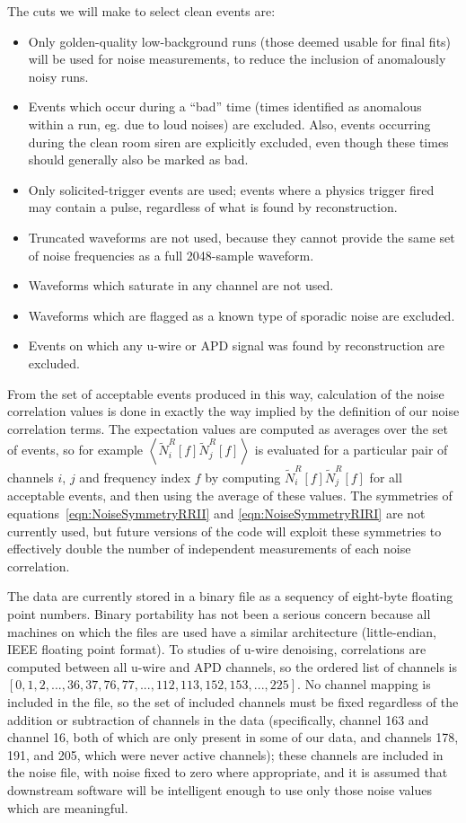 The cuts we will make to select clean events are:
\begin{itemize}
\item Only golden-quality low-background runs (those deemed usable for final fits) will be used for noise measurements, to reduce the inclusion of anomalously noisy runs.
\item Events which occur during a ``bad'' time (times identified as anomalous within a run, eg. due to loud noises) are excluded.  Also, events occurring during the clean room siren are explicitly excluded, even though these times should generally also be marked as bad.
\item Only solicited-trigger events are used; events where a physics trigger fired may contain a pulse, regardless of what is found by reconstruction.
\item Truncated waveforms are not used, because they cannot provide the same set of noise frequencies as a full 2048-sample waveform.
\item Waveforms which saturate in any channel are not used.
\item Waveforms which are flagged as a known type of sporadic noise are excluded.
\item Events on which any u-wire or APD signal was found by reconstruction are excluded.
\end{itemize}

From the set of acceptable events produced in this way, calculation of the noise correlation values is done in exactly the way implied by the definition of our noise correlation terms.  The expectation values are computed as averages over the set of events, so for example $\left<\widetilde{N}^R_i[f] \widetilde{N}^R_j[f]\right>$ is evaluated for a particular pair of channels $i$, $j$ and frequency index $f$ by computing $\widetilde{N}^R_i[f] \widetilde{N}^R_j[f]$ for all acceptable events, and then using the average of these values.  The symmetries of equations~\ref{eqn:NoiseSymmetryRRII} and \ref{eqn:NoiseSymmetryRIRI} are not currently used, but future versions of the code will exploit these symmetries to effectively double the number of independent measurements of each noise correlation.

The data are currently stored in a binary file as a sequency of eight-byte floating point numbers.  Binary portability has not been a serious concern because all machines on which the files are used have a similar architecture (little-endian, IEEE floating point format).  To studies of u-wire denoising, correlations are computed between all u-wire and APD channels, so the ordered list of channels is $[0,1,2,...,36,37,76,77,...,112,113,152,153,...,225]$.  No channel mapping is included in the file, so the set of included channels must be fixed regardless of the addition or subtraction of channels in the data (specifically, channel 163 and channel 16, both of which are only present in some of our data, and channels 178, 191, and 205, which were never active channels); these channels are included in the noise file, with noise fixed to zero where appropriate, and it is assumed that downstream software will be intelligent enough to use only those noise values which are meaningful.

